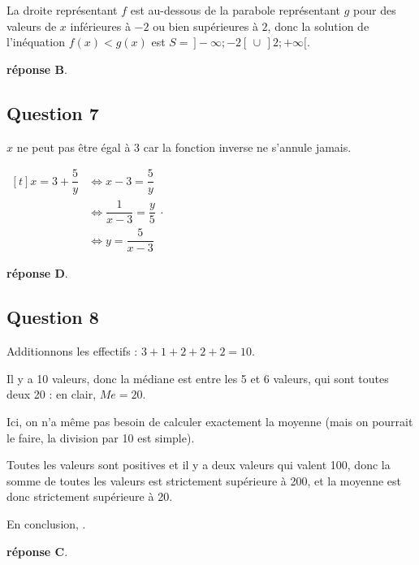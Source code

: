 \documentclass[10pt]{article}
\begin{document}
	La droite représentant $f$ est au-dessous de la parabole représentant $g$ pour des valeurs de $x$ inférieures à $-2$ ou bien supérieures à $2$, donc la solution de l'inéquation {$f(x)<g(x)$} est {$S=\,]-\infty ; -2[\,\cup\,]2 ; +\infty[$}.

	\textbf{réponse B}.

\subsection*{Question 7}
	$x$ ne peut pas être égal à $3$ car la fonction inverse ne s'annule jamais.

	{$\begin{aligned}[t]
			x=3+\dfrac5 y
			&\iff x-3=\dfrac 5 y\\
			&\iff \dfrac{1}{x-3}=\dfrac y 5\\
			&\iff y=\dfrac{5}{x-3}
		\end{aligned}$}.

	\textbf{réponse D}.

\subsection*{Question 8}
	Additionnons les effectifs : \quad $3 + 1 + 2 + 2 + 2 = 10$.

	Il y a 10 valeurs, donc la médiane est entre les 5 et 6 valeurs, qui sont toutes deux 20 : en clair, $\textit{Me} =20 $.

	Ici, on n'a même pas besoin de calculer exactement la moyenne (mais on pourrait le faire, la division par 10 est simple).

	Toutes les valeurs sont positives et il y a deux valeurs qui valent 100, donc la somme de toutes les valeurs est strictement supérieure à 200, et la moyenne est donc strictement supérieure à 20.

	En conclusion, .

	\textbf{réponse C}.
\end{document}
